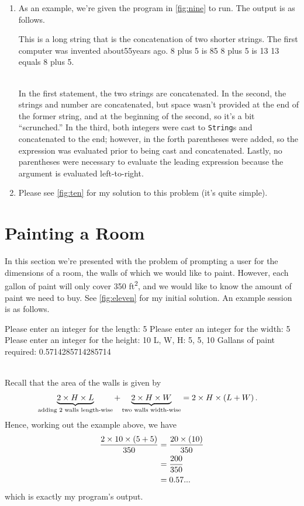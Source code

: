 \documentclass[leqno, 11pt]{article}
\begin{document}
\begin{enumerate}
  \item As an example, we're given the program in \autoref{fig:nine} to run. The output is as follows.
  \begin{verbbox}
  This is a long string that is the concatenation of two shorter strings.
  The first computer was invented about55years ago.
  8 plus 5 is 85
  8 plus 5 is 13
  13 equals 8 plus 5.
  \end{verbbox}
  \begin{figure}[h!]
    \centering
    \theverbbox
  \end{figure}\\
  In the first statement, the two strings are concatenated. In the second, the strings and number are concatenated, but space wasn't provided at the end of the former string, and at the beginning of the second, so it's a bit ``scrunched.'' In the third, both integers were cast to \texttt{String}s and concatenated to the end; however, in the forth parentheses were added, so the expression was evaluated prior to being cast and concatenated. Lastly, no parentheses were necessary to evaluate the leading expression because the argument is evaluated left-to-right.
  \item Please see \autoref{fig:ten} for my solution to this problem (it's quite simple).
\end{enumerate}
\section*{Painting a Room}
In this section we're presented with the problem of prompting a user for the dimensions of a room, the walls of which we would like to paint. However, each gallon of paint will only cover 350 \si{ft^{2}}, and we would like to know the amount of paint we need to buy. See \autoref{fig:eleven} for my initial solution. An example session is as follows.
\begin{verbbox}
Please enter an integer for the length: 5
Please enter an integer for the width: 5
Please enter an integer for the height: 10
L, W, H: 5, 5, 10
Gallans of paint required: 0.5714285714285714
\end{verbbox}
\begin{figure}[h!]
  \centering
  \theverbbox
\end{figure}\\
Recall that the area of the walls is given by
\begin{align}
  \underbrace{2\times H\times L}_{\text{adding 2 walls length-wise}} + \underbrace{2\times H\times W}_{\text{two walls width-wise}}&=2\times H\times\left(L + W\right).\notag
\end{align}
Hence, working out the example above, we have
\begin{align}
  \dfrac{2\times 10\times \left(5 + 5\right)}{350}&=\dfrac{20\times\left(10\right)}{350}\notag\\&=\dfrac{200}{350}\notag\\&=0.57...\notag
\end{align}
which is exactly my program's output.
\end{document}
